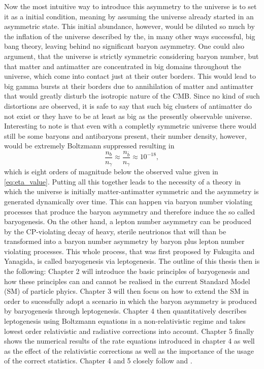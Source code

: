 Now the most intuitive way to introduce this asymmetry to the universe is to set it as a initial condition, meaning by assuming the universe already started in an asymmetric state. This initial abundance, however, would be diluted so much by the inflation of the universe described by the, in many other ways successful, big bang theory, leaving behind no significant baryon asymmetry. One could also argument, that the universe is strictly symmetric considering baryon number, but that matter and antimatter are concentrated in big domains throughout the universe, which come into contact just at their outer borders. This would lead to big gamma bursts at their borders due to annihilation of matter and antimatter that would greatly disturb the isotropic nature of the CMB. Since no kind of such distortions are observed, it is safe to say that such big clusters of antimatter do not exist or they have to be at least as big as the presently observable universe\cite{Cline:2006ts}. Interesting to note is that even with a completly symmetric universe there would still be some baryons and antibaryons present, their number density, however, would be extremely Boltzmann suppressed resulting in\cite[Eq. (1.27)]{Biondini:2016hhn}
\begin{equation}
	\frac{n_b}{n_\gamma}\approx	\frac{n_{\bar{b}}}{n_\gamma}\approx10^{-18},
\end{equation}
which is eight orders of magnitude below the observed value given in \eqref{eq:eta_value}.\newline \indent
Putting all this together leads to the necessity of a theory in which the universe is initially matter-antimatter symmetric and the asymmetry is generated dynamically over time. This can happen via baryon number violating processes that produce the baryon asymmetry and therefore induce the so called baryogenesis. On the other hand, a lepton number asymmetry can be produced by the CP-violating decay of heavy, sterile neutrionos that will than be transformed into a baryon number asymmetry by baryon plus lepton number violating processes. This whole process, that was first proposed by Fukugita and Yanagida\cite{Fukugita:1986hr}, is called baryogenesis via leptogenesis. \newline \indent
The outline of this thesis then is the following: Chapter 2 will introduce the basic principles of baryogenesis and how these principles can and cannot be realised in the current Standard Model (SM) of particle phyics. Chapter 3 will then focus on how to extend the SM in order to sucessfully adopt a scenario in which the baryon asymmetry is produced by baryogenesis through leptogenesis. Chapter 4 then quantitatively describes leptogenesis using Boltzmann equations in a non-relativistic regime and takes lowest order relativistic and radiative corrections into account. Chapter 5 finally shows the numerical results of the rate equations introduced in chapter 4 as well as the effect of the relativistic %
corrections as well as the importance of the usage of the correct statistics. \newline\indent
Chapter 4 and 5 closely follow \cite{Bodeker:2013qaa} and \cite{Wormann:2016yyi}.